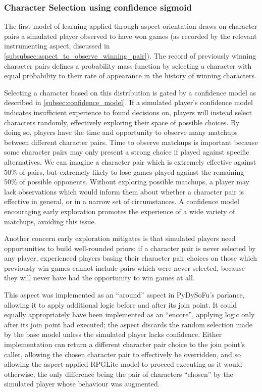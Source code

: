 \subsubsection{Character Selection using confidence sigmoid}\label{subsubsec:learning_by_picking_from_distribution_of_wins_with_confidence}

The first model of learning applied through aspect orientation draws on character pairs a 
simulated player observed to have won games (as recorded by the relevant instrumenting aspect,
discussed in \cref{subsubsec:aspect_to_observe_winning_pair}). The record of previously winning character
pairs defines a probability mass function by selecting a character with equal probability to
their rate of appearance in the history of winning characters.

Selecting a character based on this
distribution is gated by a confidence model as described in \cref{subsec:confidence_model}. If a
simulated player's confidence model indicates insufficient experience to found decisions on, players
will instead select characters randomly, effectively exploring their space of possible choices.
By doing so, players have the time and opportunity to observe many matchups between different character pairs.
Time to observe matchups is important because some character pairs may only present a strong choice
if played against specific alternatives.
We can imagine a character pair which is extremely effective against 50\% of pairs, but extremely likely
to lose games played against the remaining 50\% of possible opponents. Without exploring possible matchups,
a player may lack observations which would inform them about whether a character pair is effective in general, or
in a narrow set of circumstances. A confidence model encouraging early exploration promotes the experience
of a wide variety of matchups, avoiding this issue.

Another concern early exploration mitigates is that simulated players need opportunities to build
well-rounded priors: if a character pair is never selected by any player, experienced players basing their
character pair choices on those which previously win games cannot include pairs which were never selected,
because they will never have had the opportunity to win games at all.

This aspect was implemented as an ``around'' aspect in PyDySoFu's parlance, allowing it to
apply additional logic before and after its join point. It could equally appropriately have been
implemented as an ``encore'', applying logic only after its join point had executed; the aspect
discards the random selection made by the base model unless the simulated player lacks confidence.
Either implementation can return a different character pair choice to the join point's caller, allowing
the chosen character pair to effectively be overridden, and so allowing the aspect-applied RPGLite model to
proceed executing as it would otherwise; the only difference being the pair of characters ``chosen'' by the
simulated player whose behaviour was augmented.


